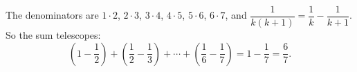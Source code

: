 The denominators are $1\cdot2$, $2\cdot3$, $3\cdot4$, $4\cdot5$, $5\cdot6$, $6\cdot7$, and $\dfrac{1}{k(k+1)}=\dfrac{1}{k}-\dfrac{1}{k+1}$. So the sum telescopes:
\[
\left(1-\dfrac{1}{2}\right)+\left(\dfrac{1}{2}-\dfrac{1}{3}\right)+\cdots+\left(\dfrac{1}{6}-\dfrac{1}{7}\right)=1-\dfrac{1}{7}=\boxed{\dfrac{6}{7}} .
\]
